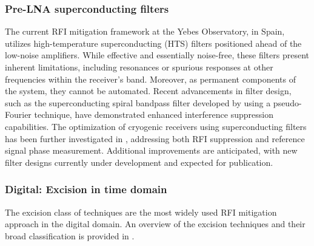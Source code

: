\subsubsection{Pre-LNA superconducting filters}
The current RFI mitigation framework at the Yebes Observatory, in Spain, utilizes high-temperature superconducting (HTS) filters positioned ahead of the low-noise amplifiers. While effective and essentially noise-free, these filters present inherent limitations, including resonances or spurious responses at other frequencies within the receiver’s band. Moreover, as permanent components of the system, they cannot be automated. Recent advancements in filter design, such as the superconducting spiral bandpass filter developed by \citep{huang2018superconducting} using a pseudo-Fourier technique, have demonstrated enhanced interference suppression capabilities. The optimization of cryogenic receivers using superconducting filters has been further investigated in \citep{garcia2023optimizacion,lopez2021tri}, addressing both RFI suppression and reference signal phase measurement. Additional improvements are anticipated, with new filter designs currently under development and expected for publication.

\subsubsection{Digital: Excision in time domain}

The excision class of techniques are the most widely used RFI mitigation approach in the digital domain. An overview of the excision techniques and their broad classification is provided in \citep{buch2019rfic}.


